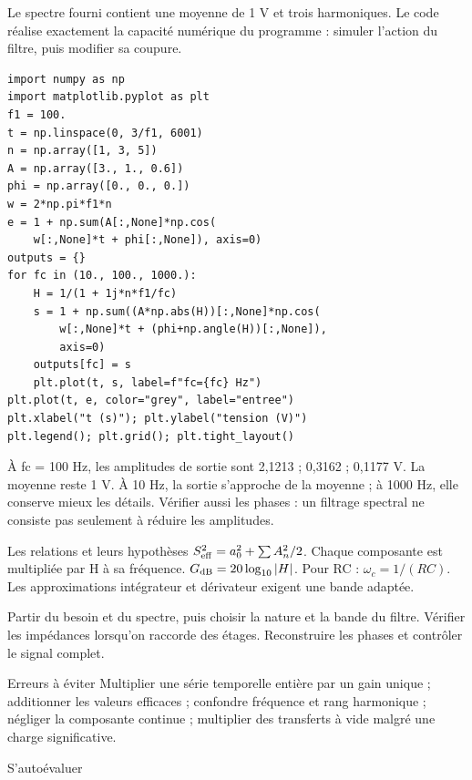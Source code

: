 Le spectre fourni contient une moyenne de 1 V et trois harmoniques. Le code réalise exactement la capacité numérique du programme : simuler l’action du filtre, puis modifier sa coupure.
\begin{verbatim}
import numpy as np
import matplotlib.pyplot as plt
f1 = 100.
t = np.linspace(0, 3/f1, 6001)
n = np.array([1, 3, 5])
A = np.array([3., 1., 0.6])
phi = np.array([0., 0., 0.])
w = 2*np.pi*f1*n
e = 1 + np.sum(A[:,None]*np.cos(
    w[:,None]*t + phi[:,None]), axis=0)
outputs = {}
for fc in (10., 100., 1000.):
    H = 1/(1 + 1j*n*f1/fc)
    s = 1 + np.sum((A*np.abs(H))[:,None]*np.cos(
        w[:,None]*t + (phi+np.angle(H))[:,None]),
        axis=0)
    outputs[fc] = s
    plt.plot(t, s, label=f"fc={fc} Hz")
plt.plot(t, e, color="grey", label="entree")
plt.xlabel("t (s)"); plt.ylabel("tension (V)")
plt.legend(); plt.grid(); plt.tight_layout()
\end{verbatim}
À fc = 100 Hz, les amplitudes de sortie sont 2,1213 ; 0,3162 ; 0,1177 V. La moyenne reste 1 V. À 10 Hz, la sortie s’approche de la moyenne ; à 1000 Hz, elle conserve mieux les détails. Vérifier aussi les phases : un filtrage spectral ne consiste pas seulement à réduire les amplitudes.


\begin{loi}{Les relations et leurs hypothèses}
$S_{\rm eff}^2=a_0^2+\sum A_n^2/2$. Chaque composante est multipliée par H à sa fréquence. $G_{\rm dB}=20\log_{10}|H|$. Pour RC : $\omega_c=1/(RC)$. Les approximations intégrateur et dérivateur exigent une bande adaptée.
\end{loi}
Partir du besoin et du spectre, puis choisir la nature et la bande du filtre. Vérifier les impédances lorsqu’on raccorde des étages. Reconstruire les phases et contrôler le signal complet.
\begin{piege}{Erreurs à éviter}
Multiplier une série temporelle entière par un gain unique ; additionner les valeurs efficaces ; confondre fréquence et rang harmonique ; négliger la composante continue ; multiplier des transferts à vide malgré une charge significative.
\end{piege}
\begin{docu}{S’autoévaluer}
\end{docu}


